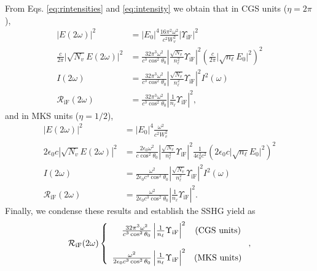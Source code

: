 From Eqs. \eqref{eq:rintensities} and \eqref{eq:intensity} we obtain that in
CGS units ($\eta=2\pi$), 
\begin{align}\label{eq:r01}
\vert E(2\omega)\vert^{2} &=
\vert E_{0}\vert^{4}\frac{16\pi^{2}\omega^{2}}{c^{2}W^2_{v}}
\vert\Upsilon_{\mathrm{iF}}\vert^{2}\nonumber\\
\frac{c}{2\pi}\vert\sqrt{N_{v}}E(2\omega)\vert^{2} &=
\frac{32\pi^{3}\omega^{2}}{c^{3}\cos^2\theta_{0}}
\left\vert\frac{\sqrt{N_{v}}}{n^{2}_{\ell}}\Upsilon_{\mathrm{iF}}\right\vert^{2} 
\left(\frac{c}{2\pi}\vert\sqrt{n_{\ell}}E_{0}\vert^{2}\right)^{2}\nonumber\\ 
I(2\omega) &=
\frac{32\pi^{3}\omega^{2}}{c^{3}\cos^2\theta_{0}}
\left\vert\frac{\sqrt{N_{v}}}{n^{2}_{\ell}}\Upsilon_{\mathrm{iF}}\right\vert^{2}
I^{2}(\omega)\nonumber\\
\mathcal{R}_{\mathrm{iF}}(2\omega) &=
\frac{32\pi^{3}\omega^{2}}{c^{3}\cos^2\theta_{0}}
\left\vert\frac{1}{n_{\ell}}\Upsilon_{\mathrm{iF}}\right\vert^{2},
\end{align} 
and in MKS units ($\eta=1/2$),
\begin{align}\label{r01m}
\vert E(2\omega)\vert^{2} &=
\vert E_{0}\vert^{4}\frac{\omega^{2}}{c^{2}W^{2}_{v}}\nonumber\\
2\epsilon_{0}c|\sqrt{N_{v}}E(2\omega)|^{2} &=
\frac{2\epsilon_{0}\omega^{2}}{c\cos^{2}\theta_{0}}
\left\vert\frac{\sqrt{N_{v}}}{n^{2}_{\ell}}\Upsilon_{\mathrm{iF}}\right\vert^{2} 
\frac{1}{4\epsilon^{2}_0c^{2}}
\left(2\epsilon_{0}c\vert\sqrt{n_{\ell}}E_{0}\vert^{2}\right)^{2}\nonumber\\
I(2\omega) &= 
\frac{\omega^{2}}{2\epsilon_{0}c^3\cos^{2}\theta_{0}}
\left\vert\frac{\sqrt{N_{v}}}{n^{2}_{\ell}}\Upsilon_{\mathrm{iF}}\right\vert^{2}
I^{2}(\omega)\nonumber\\
\mathcal{R}_{\mathrm{iF}}(2\omega) &=
\frac{\omega^{2}}{2\epsilon_{0}c^3\cos^{2}\theta_{0}}
\left\vert  \frac{1}{n_{\ell}}\Upsilon_{\mathrm{iF}}\right\vert^{2}.
\end{align}
Finally, we condense these results and establish the SSHG yield as
\begin{equation}\label{eq:mc6}
\mathcal{R}_{\mathrm{iF}}(2\omega) 
\left\{
\begin{array}{ r c } 
\frac{32\pi^{3}\omega^{2}}{c^{3}\cos^{2}\theta_{0}}
\left\vert\frac{1}{n_{\ell}}\Upsilon_{\mathrm{iF}}\right\vert^{2} 
& \text{(CGS units)} \\\\
\frac{\omega^{2}}{2\epsilon_{0}c^3\cos^{2}\theta_{0}}
\left\vert\frac{1}{n_{\ell}}\Upsilon_{\mathrm{iF}}\right\vert^{2} 
& \text{(MKS units)} 
\end{array}
\right.,
\end{equation}
